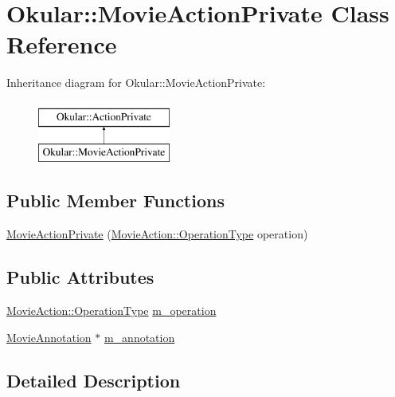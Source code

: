 \hypertarget{classOkular_1_1MovieActionPrivate}{\section{Okular\+:\+:Movie\+Action\+Private Class Reference}
\label{classOkular_1_1MovieActionPrivate}
}
Inheritance diagram for Okular\+:\+:Movie\+Action\+Private\+:\begin{figure}[H]
\begin{center}
\leavevmode
\includegraphics[height=2.000000cm]{classOkular_1_1MovieActionPrivate}
\end{center}
\end{figure}
\subsection*{Public Member Functions}
\begin{DoxyCompactItemize}
\item 
\hyperlink{classOkular_1_1MovieActionPrivate_a2762122dd100aa8d3a5698276a59918e}{Movie\+Action\+Private} (\hyperlink{classOkular_1_1MovieAction_ade5698179043c1075b37aa1dc7638331}{Movie\+Action\+::\+Operation\+Type} operation)
\end{DoxyCompactItemize}
\subsection*{Public Attributes}
\begin{DoxyCompactItemize}
\item 
\hyperlink{classOkular_1_1MovieAction_ade5698179043c1075b37aa1dc7638331}{Movie\+Action\+::\+Operation\+Type} \hyperlink{classOkular_1_1MovieActionPrivate_abe2655c9684cbe5f61cf7294bad5f0bf}{m\+\_\+operation}
\item 
\hyperlink{classOkular_1_1MovieAnnotation}{Movie\+Annotation} $\ast$ \hyperlink{classOkular_1_1MovieActionPrivate_a7b2e50bde5818db4d489119ffe49acc7}{m\+\_\+annotation}
\end{DoxyCompactItemize}


\subsection{Detailed Description}


